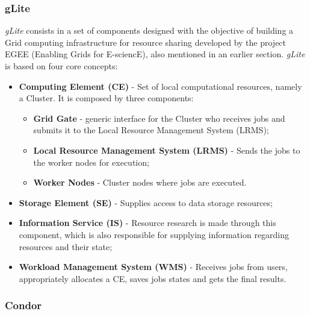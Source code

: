 \subsubsection{gLite}\label{glite}

\textit{gLite} consists in a set of components designed with the objective of building a Grid computing infrastructure for resource sharing developed by the project EGEE (Enabling Grids for E-sciencE), also mentioned in an earlier section.
\textit{gLite} is based on four core concepts:
\begin{itemize}
\item \textbf{Computing Element (CE)} - Set of local computational resources, namely a Cluster. It is composed by three components:
	\begin{itemize}
	\item \textbf{Grid Gate} - generic interface for the Cluster who receives jobs and submits it to the Local Resource Management System (LRMS);
	\item \textbf{Local Resource Management System (LRMS)} - Sends the jobs to the worker nodes for execution;
	\item \textbf{Worker Nodes} - Cluster nodes where jobs are executed.
	\end{itemize}
\item \textbf{Storage Element (SE)} - Supplies access to data storage resources;
\item \textbf{Information Service (IS)} - Resource research is made through this component, which is also responsible for supplying information regarding resources and their state;
\item \textbf{Workload Management System (WMS)} - Receives jobs from users, appropriately allocates a CE, saves jobs states and gets the final results.\cite{jorge-ruao,glite}
\end{itemize}

\subsubsection{Condor}\label{condor}

